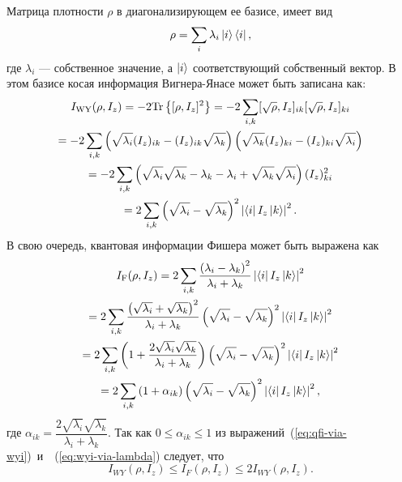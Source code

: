 Матрица плотности $\rho$ в диагонализирующем ее базисе,
имеет вид
%
\begin{equation}
  \rho = \sum\limits_i \lambda_i \left| i \right\rangle\left\langle i \right|,
\end{equation}
%
где $\lambda_i$ --- собственное значение,
а $\left| i \right\rangle$ соответствующий собственный вектор.
%
В этом базисе косая информация Вигнера-Янасе может быть записана как:
%
\begin{multline}\label{eq:wyi-via-lambda}
  I_\mathrm{WY}(\rho, I_z)
  = -2 \mathrm{Tr} \left\{ [\rho, I_z]^2 \right\}
  = -2 \sum\limits_{i,k} [\sqrt{\rho}, I_z]_{ik} [\sqrt{\rho}, I_z]_{ki}
  \\
  = -2 \sum\limits_{i,k}
    \left( \sqrt{\lambda_i}(I_z)_{ik} - (I_z)_{ik} \sqrt{\lambda_k} \right)
    \left( \sqrt{\lambda_k}(I_z)_{ki} - (I_z)_{ki} \sqrt{\lambda_i} \right)
  \\
  = -2 \sum\limits_{i,k} \left( 
    \sqrt{\lambda_i}\sqrt{\lambda_k}
    - \lambda_k
    - \lambda_i
    + \sqrt{\lambda_k}\sqrt{\lambda_i}
     \right)
    (I_z)^2_{ki}
  \\
  = 2 \sum\limits_{i,k} \left( \sqrt{\lambda_i} -\sqrt{\lambda_k} \right)^2
    \left| \left\langle i \right| I_z \left| k \right\rangle \right|^2.
\end{multline}
%
В свою очередь, квантовая информации Фишера может быть выражена как
%
\begin{multline}\label{eq:qfi-via-wyi}
  I_\mathrm{F}(\rho, I_z)
  = 2 \sum\limits_{i,k}
    \dfrac{\left( \lambda_i - \lambda_k \right)^2}{\lambda_i + \lambda_k}
    \left| \left\langle i \right| I_z \left| k \right\rangle \right|^2
  \\
  = 2 \sum\limits_{i,k}
    \dfrac{
      \left( \sqrt{\lambda_i} +\sqrt{\lambda_k} \right)^2
    }{
      \lambda_i + \lambda_k
    }
    \left( \sqrt{\lambda_i} -\sqrt{\lambda_k} \right)^2
    \left| \left\langle i \right| I_z \left| k \right\rangle \right|^2
  \\
  = 2 \sum\limits_{i,k}
    \left( 1 + \dfrac{2\sqrt{\lambda_i}\sqrt{\lambda_k}}{\lambda_i + \lambda_k} \right)
    \left( \sqrt{\lambda_i} -\sqrt{\lambda_k} \right)^2
    \left| \left\langle i \right| I_z \left| k \right\rangle \right|^2
  \\
  = 2 \sum\limits_{i,k} \left( 1 + \alpha_{ik} \right)
  \left( \sqrt{\lambda_i} -\sqrt{\lambda_k} \right)^2
  \left| \left\langle i \right| I_z \left| k \right\rangle \right|^2,
\end{multline}
%
где $\alpha_{ik} = \dfrac{2\sqrt{\lambda_i}\sqrt{\lambda_k}}{\lambda_i + \lambda_k}$.
Так как $ 0 \leq \alpha_{ik} \leq 1$
из выражений~(\ref{eq:qfi-via-wyi})~и~~(\ref{eq:wyi-via-lambda}) следует, что
%
\begin{equation} \label{eq:qfi-wyi-inequality}
    I_{WY}\left(\rho, I_z\right)
    \leq I_F\left(\rho, I_z\right)
    \leq 2I_{WY}\left(\rho, I_z\right).
\end{equation}
